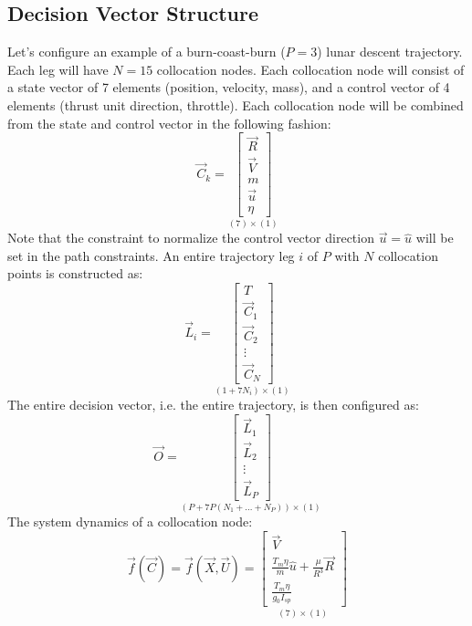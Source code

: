 \newpage
\subsection{Decision Vector Structure}
Let's configure an example of a burn-coast-burn ($P=3$) lunar descent trajectory. Each leg will have $N=15$ collocation nodes. Each collocation node will consist of a state vector of 7 elements (position, velocity, mass), and a control vector of 4 elements (thrust unit direction, throttle). Each collocation node will be combined from the state and control vector in the following fashion:
\begin{equation}
\vec{C}_k = 
\underset{(7) \times (1)}{
\begin{bmatrix}
\vec{R} \\ \vec{V} \\ m \\ \vec{u} \\ \eta
\end{bmatrix}
}
\end{equation}
Note that the constraint to normalize the control vector direction $\vec{u} = \hat{u}$ will be set in the path constraints. An entire trajectory leg $i$ of $P$ with $N$ collocation points is constructed as:
\begin{equation}
\vec{L}_i = 
\underset{(1 + 7N_i) \times (1)}{
\begin{bmatrix}
T \\ \vec{C}_1 \\ \vec{C}_2 \\ \vdots \\ \vec{C}_N
\end{bmatrix}
}
\end{equation} 
The entire decision vector, i.e. the entire trajectory, is then configured as:
\begin{equation}
\vec{O} = 
\underset{(P+7P(N_1 + ... + N_P)) \times (1)}{
\begin{bmatrix}
\vec{L}_1 \\ \vec{L}_2 \\ \vdots \\ \vec{L}_P
\end{bmatrix}
}
\end{equation}
The system dynamics of a collocation node:
\begin{equation}
\vec{f} ( \vec{C} ) = \vec{f}(\vec{X},\vec{U}) = 
\underset{(7) \times (1)}{
\begin{bmatrix}
\vec{V} \\
\frac{T_m \eta}{m} \hat{u} + \frac{\mu}{R^3}\vec{R} \\
\frac{T_m \eta}{g_0 I_{sp}}
\end{bmatrix}
}
\end{equation}
